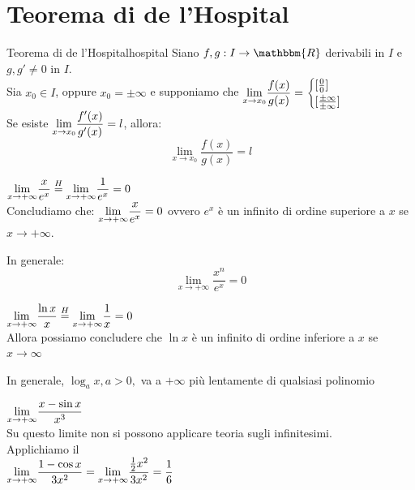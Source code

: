 \documentclass[12pt]{report}
\newcounter{theorem}
\newcommand{\namerefl}[1]{%
	\bgroup
	\let\nmu\MakeLowercase
	\nameref{#1}\egroup}
\newcommand{\nmu}{}
\begin{document}
  	\section{Teorema di de l'Hospital}
  	\begin{theorem}{\nmu Teorema di de l'Hospital}{hospital}
  		Siano $f, g: I \to \mathbbm{R}$ derivabili in $I$ e $g, g' \neq 0$ in $I$. \\
  		Sia $x_0 \in I$, oppure $x_0 = \pm\infty$ e supponiamo che $\mathlarger{\lim_{x \to {x_0}}}\dfrac{f(x)}{g(x)} = \begin{cases}
  			[\frac{0}{0}] \\
  			[\frac{\pm\infty}{\pm\infty}]
   		\end{cases}$ \\
   		Se esiste $\mathlarger{\lim_{x \to {x_0}}}\dfrac{f'(x)}{g'(x)} = l$, allora:
   		\[
   		\lim_{x \to {x_0}}\frac{f(x)}{g(x)} = l
   		\]
  	\end{theorem}
  	\begin{example}{}{}
  		$\mathlarger{\lim_{x \to +\infty}}\dfrac{x}{e^x} \overset{H}{=} \mathlarger{\lim_{x \to +\infty}}\dfrac{1}{e^x} = 0$ \\
  		Concludiamo che: $\mathlarger{\lim_{x \to +\infty}}\dfrac{x}{e^x} = 0$ ovvero $e^x$ è un infinito di ordine superiore a $x$ se $x \to +\infty$.
  	\end{example}
  	\begin{note}{}{}
  		In generale:
  		\[
  		\lim_{x \to +\infty}\dfrac{x^n}{e^x} = 0
  		\]
  	\end{note}
  	\begin{example}{}{}
  		$\mathlarger{\lim_{x \to +\infty}}\dfrac{\ln x}{x} \overset{H}{=} \mathlarger{\lim_{x \to +\infty}}\dfrac{1}{x} = 0$ \\
  		Allora possiamo concludere che $\ln x$ è un infinito di ordine inferiore a $x$ se $x \to \infty$
  	\end{example}
  	\begin{note}{}{}
  		In generale, $\log_a{x}, a > 0,$ va a $+\infty$ più lentamente di qualsiasi polinomio
  	\end{note}
  	\begin{example}{}{}
  		$\mathlarger{\lim_{x \to +\infty}}\dfrac{x - \sin x}{x^3}$ \\
  		Su questo limite non si possono applicare teoria sugli infinitesimi. \\
  		Applichiamo il \namerefl{th:hospital} \\
  		$\mathlarger{\lim_{x \to +\infty}}\dfrac{1 - \cos x}{3x^2} = \mathlarger{\lim_{x \to +\infty}}\dfrac{\frac{1}{2}x^2}{3x^2} = \dfrac{1}{6}$
  	\end{example}
\end{document}
